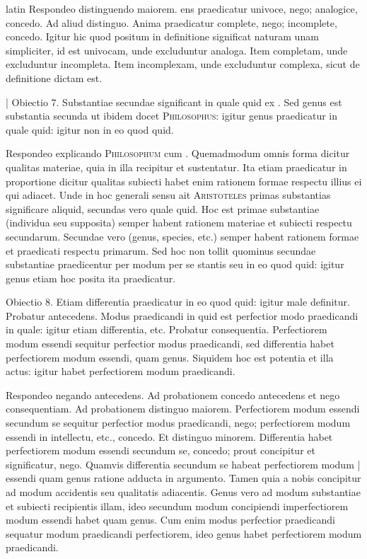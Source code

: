 \begin{otherlanguage*}{latin}
\pstart
Respondeo distinguendo maiorem. ens praedicatur univoce, nego; analogice, concedo. Ad aliud distinguo. Anima praedicatur complete, nego; incomplete, concedo. Igitur hic quod positum in definitione significat naturam unam simpliciter, id est univocam, unde excluduntur analoga. Item completam, unde excluduntur incompleta. Item incomplexam, unde excluduntur complexa, sicut de definitione dictam est. 
\pend

\pstart
\textnormal{|} Obiectio 7. Substantiae secundae significant in quale quid ex . Sed genus est substantia secunda ut ibidem docet \textsc{Philosophus}:
igitur genus praedicatur in quale quid:
igitur non in eo quod quid. 
\pend

\pstart
Respondeo explicando \textsc{Philosophum} cum . Quemadmodum omnis forma dicitur qualitas materiae, quia in illa recipitur et sustentatur. Ita etiam praedicatur in proportione dicitur qualitas subiecti habet enim rationem formae respectu illius ei qui adiacet. Unde in hoc generali sensu ait \textsc{Aristoteles} primas substantias significare aliquid, secundas vero quale quid. Hoc est primae substantiae (individua seu supposita) semper habent rationem materiae et subiecti respectu secundarum. Secundae vero (genus, species, etc.) semper habent rationem formae et praedicati respectu primarum. Sed hoc non tollit quominus secundae substantiae praedicentur per modum per se stantis seu in eo quod quid:
igitur genus etiam hoc posita ita praedicatur. 
\pend

\pstart
Obiectio 8. Etiam differentia praedicatur in eo quod quid:
igitur male definitur. Probatur antecedens. Modus praedicandi in quid est perfectior modo praedicandi in quale:
igitur etiam differentia, etc. Probatur consequentia. Perfectiorem modum essendi sequitur perfectior modus praedicandi, sed differentia habet perfectiorem modum essendi, quam genus. Siquidem hoc est potentia et illa actus:
igitur habet perfectiorem modum praedicandi. 
\pend

\pstart
Respondeo negando antecedens. Ad probationem concedo antecedens et nego consequentiam. Ad probationem distinguo maiorem. Perfectiorem modum essendi secundum se sequitur perfectior modus praedicandi, nego; perfectiorem modum essendi in intellectu, etc., concedo. Et distinguo minorem. Differentia habet perfectiorem modum essendi secundum se, concedo; prout concipitur et significatur, nego. Quamvis differentia secundum se habeat perfectiorem modum \textnormal{|} essendi quam genus ratione adducta in argumento. Tamen quia a nobis concipitur ad modum accidentis seu qualitatis adiacentis. Genus vero ad modum substantiae et subiecti recipientis illam, ideo secundum modum concipiendi imperfectiorem modum essendi habet quam genus. Cum enim modus perfectior praedicandi sequatur modum praedicandi perfectiorem, ideo genus habet perfectiorem modum praedicandi. 
\pend


\end{otherlanguage*}

